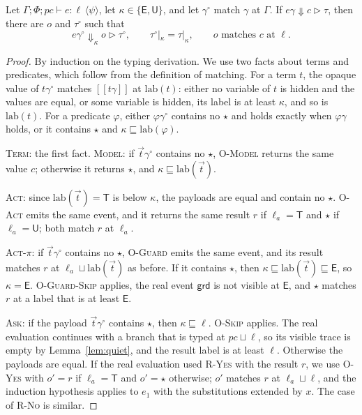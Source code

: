 \documentclass[acmsmall,nonacm,screen]{acmart}
\newcommand{\kw}[1]{\mathsf{#1}}
\newcommand{\T}{\kw{T}}
\newcommand{\E}{\kw{E}}
\newcommand{\U}{\kw{U}}
\newcommand{\lab}{\mathrm{lab}}
\newcommand{\ev}[3]{#1 \Downarrow #2 \triangleright #3}
\newcommand{\oev}[4]{#1 \Downarrow_{#2} #3 \triangleright #4}
\newcommand{\sem}[1]{[\![#1]\!]}
\newcommand{\op}{\star}
\newcommand{\ty}[4]{\Gamma; #1; #2 \vdash #3 : #4}
\newcommand{\post}[1]{\langle #1 \rangle}
\newcommand{\vis}[2]{#1|_{#2}}
\begin{document}
\begin{theorem}
\label{thm:abstraction}
Let $\ty{\Phi}{pc}{e}{\ell\,\post{\psi}}$, let $\kappa \in \{\E, \U\}$, and let
$\gamma^\circ$ match $\gamma$ at $\Gamma$. If $\ev{e\gamma}{c}{\tau}$, then there are $o$ and
$\tau^\circ$ such that
\[
\oev{e\gamma^\circ}{\kappa}{o}{\tau^\circ}, \qquad
\vis{\tau^\circ}{\kappa} = \vis{\tau}{\kappa}, \qquad
o \text{ matches } c \text{ at } \ell .
\]
\end{theorem}

\begin{proof}
By induction on the typing derivation. We use two facts about terms and predicates, which
follow from the definition of matching. For a term $t$, the opaque value of $t\gamma^\circ$
matches $\sem{t\gamma}$ at $\lab(t)$: either no variable of $t$ is hidden and the values are
equal, or some variable is hidden, its label is at least $\kappa$, and so is $\lab(t)$. For a
predicate $\varphi$, either $\varphi\gamma^\circ$ contains no $\op$ and holds exactly when
$\varphi\gamma$ holds, or it contains $\op$ and $\kappa \sqsubseteq \lab(\varphi)$.

\textsc{Term}: the first fact. \textsc{Model}: if $\vec t\gamma^\circ$ contains no $\op$,
\textsc{O-Model} returns the same value $c$; otherwise it returns $\op$, and
$\kappa \sqsubseteq \lab(\vec t)$.

\textsc{Act}: since $\lab(\vec t) = \T$ is below $\kappa$, the payloads are equal and contain
no $\op$. \textsc{O-Act} emits the same event, and it returns the same result $r$ if
$\ell_a = \T$ and $\op$ if $\ell_a = \U$; both match $r$ at $\ell_a$.

\textsc{Act-$\pi$}: if $\vec t\gamma^\circ$ contains no $\op$, \textsc{O-Guard} emits the
same event, and its result matches $r$ at $\ell_a \sqcup \lab(\vec t)$ as before. If it
contains $\op$, then $\kappa \sqsubseteq \lab(\vec t) \sqsubseteq \E$, so $\kappa = \E$.
\textsc{O-Guard-Skip} applies, the real event $\kw{grd}$ is not visible at $\E$, and $\op$
matches $r$ at a label that is at least $\E$.

\textsc{Ask}: if the payload $\vec t\gamma^\circ$ contains $\op$, then
$\kappa \sqsubseteq \ell$. \textsc{O-Skip} applies. The real evaluation continues with a
branch that is typed at $pc \sqcup \ell$, so its visible trace is empty by
Lemma~\ref{lem:quiet}, and the result label is at least $\ell$. Otherwise the payloads are
equal. If the real evaluation used \textsc{R-Yes} with the result $r$, we use \textsc{O-Yes}
with $o' = r$ if $\ell_a = \T$ and $o' = \op$ otherwise; $o'$ matches $r$ at
$\ell_a \sqcup \ell$, and the induction hypothesis applies to $e_1$ with the substitutions
extended by $x$. The case of \textsc{R-No} is similar.


\end{proof}
\end{document}
